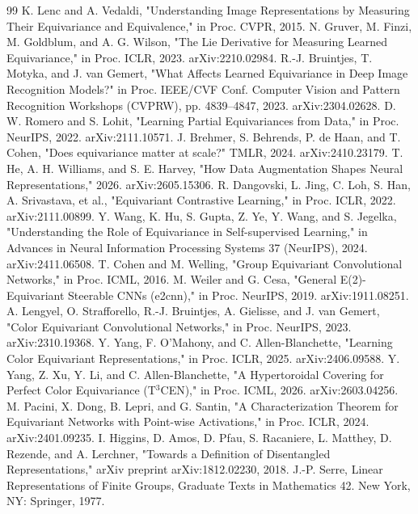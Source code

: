 \clearpage
\begin{thebibliography}{99}
\footnotesize
\bibitem{} K. Lenc and A. Vedaldi, "Understanding Image Representations by Measuring Their Equivariance and Equivalence," in Proc. CVPR, 2015.
\bibitem{} N. Gruver, M. Finzi, M. Goldblum, and A. G. Wilson, "The Lie Derivative for Measuring Learned Equivariance," in Proc. ICLR, 2023. arXiv:2210.02984.
\bibitem{} R.-J. Bruintjes, T. Motyka, and J. van Gemert, "What Affects Learned Equivariance in Deep Image Recognition Models?" in Proc. IEEE/CVF Conf. Computer Vision and Pattern Recognition Workshops (CVPRW), pp. 4839--4847, 2023. arXiv:2304.02628.
\bibitem{} D. W. Romero and S. Lohit, "Learning Partial Equivariances from Data," in Proc. NeurIPS, 2022. arXiv:2111.10571.
\bibitem{} J. Brehmer, S. Behrends, P. de Haan, and T. Cohen, "Does equivariance matter at scale?" TMLR, 2024. arXiv:2410.23179.
\bibitem{} T. He, A. H. Williams, and S. E. Harvey, "How Data Augmentation Shapes Neural Representations," 2026. arXiv:2605.15306.
\bibitem{} R. Dangovski, L. Jing, C. Loh, S. Han, A. Srivastava, et al., "Equivariant Contrastive Learning," in Proc. ICLR, 2022. arXiv:2111.00899.
\bibitem{} Y. Wang, K. Hu, S. Gupta, Z. Ye, Y. Wang, and S. Jegelka, "Understanding the Role of Equivariance in Self-supervised Learning," in Advances in Neural Information Processing Systems 37 (NeurIPS), 2024. arXiv:2411.06508.
\bibitem{} T. Cohen and M. Welling, "Group Equivariant Convolutional Networks," in Proc. ICML, 2016.
\bibitem{} M. Weiler and G. Cesa, "General E(2)-Equivariant Steerable CNNs (e2cnn)," in Proc. NeurIPS, 2019. arXiv:1911.08251.
\bibitem{} A. Lengyel, O. Strafforello, R.-J. Bruintjes, A. Gielisse, and J. van Gemert, "Color Equivariant Convolutional Networks," in Proc. NeurIPS, 2023. arXiv:2310.19368.
\bibitem{} Y. Yang, F. O'Mahony, and C. Allen-Blanchette, "Learning Color Equivariant Representations," in Proc. ICLR, 2025. arXiv:2406.09588.
\bibitem{} Y. Yang, Z. Xu, Y. Li, and C. Allen-Blanchette, "A Hypertoroidal Covering for Perfect Color Equivariance (T$^3$CEN)," in Proc. ICML, 2026. arXiv:2603.04256.
\bibitem{} M. Pacini, X. Dong, B. Lepri, and G. Santin, "A Characterization Theorem for Equivariant Networks with Point-wise Activations," in Proc. ICLR, 2024. arXiv:2401.09235.
\bibitem{} I. Higgins, D. Amos, D. Pfau, S. Racaniere, L. Matthey, D. Rezende, and A. Lerchner, "Towards a Definition of Disentangled Representations," arXiv preprint arXiv:1812.02230, 2018.
\bibitem{} J.-P. Serre, Linear Representations of Finite Groups, Graduate Texts in Mathematics 42. New York, NY: Springer, 1977.

\end{thebibliography}
